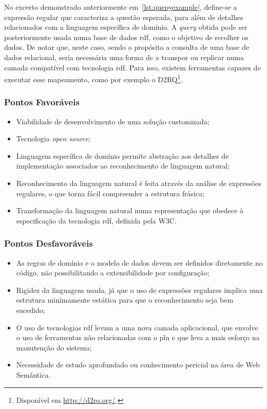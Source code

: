 No excerto demonstrado anteriormente em~\ref{lst:quepyexample}, define-se a expressão regular que caracteriza a questão esperada, para além de detalhes relacionados com a linguagem específica de domínio. A \textit{query} obtida pode ser posteriormente usada numa base de dados \gls{rdf}, como o objetivo de recolher os dados. De notar que, neste caso, sendo o propósito a consulta de uma base de dados relacional, seria necessária uma forma de a transpor ou replicar numa camada compatível com tecnologia \gls{rdf}. Para isso, existem ferramentas capazes de executar esse mapeamento, como por exemplo o D2RQ\footnote{Disponível em \url{http://d2rq.org/}.}.

\subsubsection*{Pontos Favoráveis}
\begin{itemize}
    \item
    {
        Viabilidade de desenvolvimento de uma solução customizada;
    }
    \item
    {
        Tecnologia \textit{open source};
    }
    \item 
    {
        Linguagem específica de domínio permite abstração aos detalhes de implementação associados ao reconhecimento de linguagem natural;
    }
    \item
    {
        Reconhecimento da linguagem natural é feita através da análise de expressões regulares, o que torna fácil compreender a estrutura frásica;
    }
    \item
    {
        Transformação da linguagem natural numa representação que obedece à especificação da tecnologia \gls{rdf}, definida pela W3C.
    }
\end{itemize}

\subsubsection*{Pontos Desfavoráveis}
\begin{itemize}
    \item
    {
        As regras de domínio e o modelo de dados devem ser definidos diretamente no código, não possibilitando a extensibilidade por configuração;
    }
    \item
    {
        Rigidez da linguagem usada, já que o uso de expressões regulares implica uma estrutura minimamente estática para que o reconhecimento seja bem sucedido;
    }
    \item
    {
        O uso de tecnologias \gls{rdf} levam a uma nova camada aplicacional, que envolve o uso de ferramentas não relacionadas com o \gls{pln} e que leva a mais esforço na manutenção do sistema;
    }
    \item
    {
        Necessidade de estudo aprofundado ou conhecimento pericial na área de Web Semântica.
    }
\end{itemize}

